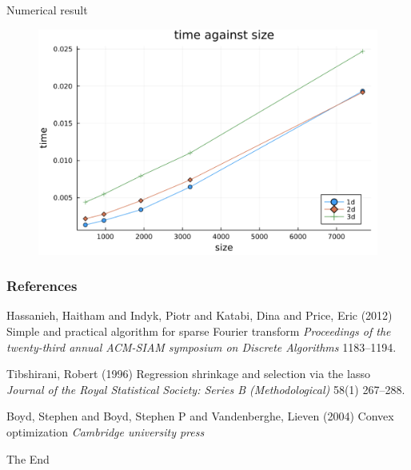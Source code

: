 \documentclass{beamer}
\begin{document}
\begin{frame}{Numerical result}
\begin{figure}
    \centering
    \includegraphics[width=0.6\linewidth]{Interior Point Method/time against size.png}
\end{figure}
\end{frame}


\begin{frame}
\frametitle{References}
\footnotesize{
\begin{thebibliography}{99} %
 Hassanieh, Haitham and Indyk, Piotr and Katabi, Dina and Price, Eric (2012)
\newblock Simple and practical algorithm for sparse Fourier transform
\newblock \emph{Proceedings of the twenty-third annual ACM-SIAM symposium on Discrete Algorithms} 1183--1194.

 Tibshirani, Robert (1996)
\newblock Regression shrinkage and selection via the lasso
\newblock \emph{Journal of the Royal Statistical Society: Series B (Methodological)} 58(1) 267--288.

 Boyd, Stephen and Boyd, Stephen P and Vandenberghe, Lieven (2004)
\newblock Convex optimization
\newblock \emph{Cambridge university press}
\end{thebibliography}
}
\end{frame}


\begin{frame}
\Huge{\centerline{The End}}
\end{frame}

\end{document}
